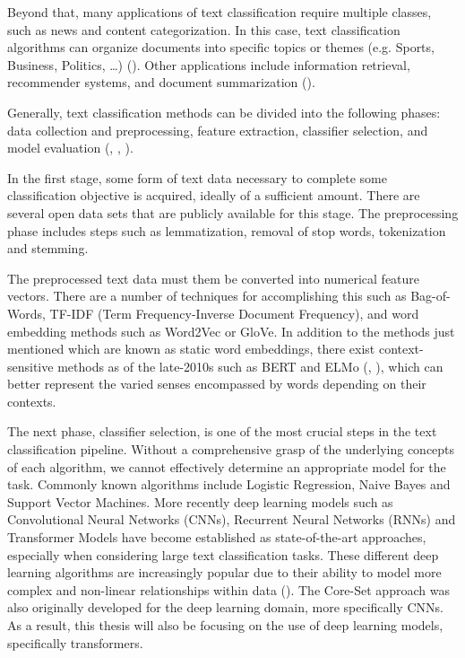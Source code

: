 \documentclass[english,bachelor,ul]{webisthesis} %
\begin{document}
Beyond that, many applications of text classification require multiple classes, such as news and content categorization. In this case, text classification algorithms can organize documents into specific topics or themes (e.g. Sports, Business, Politics, \dots) (\cite{DBLP:journals/csur/Sebastiani02}). Other applications include information retrieval, recommender systems, and document summarization (\cite{DBLP:journals/information/KowsariMHMBB19}).

Generally, text classification methods can be divided into the following phases: data collection and preprocessing, feature extraction, classifier selection, and model evaluation (\cite{DBLP:journals/information/KowsariMHMBB19}, \cite{DBLP:journals/eswa/MironczukP18}, \cite{ikonomakis2005text}).

In the first stage, some form of text data necessary to complete some classification objective is acquired, ideally of a sufficient amount. There are several open data sets that are publicly available for this stage. The preprocessing phase includes steps such as lemmatization, removal of stop words, tokenization and stemming. 

The preprocessed text data must them be converted into numerical feature vectors. There are a number of techniques for accomplishing this such as Bag-of-Words, TF-IDF (Term Frequency-Inverse Document Frequency), and word embedding methods such as Word2Vec or GloVe. In addition to the methods just mentioned which are known as static word embeddings, there exist context-sensitive methods as of the late-2010s such as BERT and ELMo (\cite{DBLP:conf/naacl/DevlinCLT19}, \cite{DBLP:conf/naacl/PetersNIGCLZ18}), which can better represent the varied senses encompassed by words depending on their contexts.

The next phase, classifier selection, is one of the most crucial steps in the text classification pipeline. Without a comprehensive grasp of the underlying concepts of each algorithm, we cannot effectively determine an appropriate model for the task. Commonly known algorithms include Logistic Regression, Naive Bayes and Support Vector Machines. More recently deep learning models such as Convolutional Neural Networks (CNNs), Recurrent Neural Networks (RNNs) and Transformer Models have become established as state-of-the-art approaches, especially when considering large text classification tasks. These different deep learning algorithms are increasingly popular due to their ability to model more complex and non-linear relationships within data (\cite{DBLP:journals/nature/LeCunBH15}). The Core-Set approach was also originally developed for the deep learning domain, more specifically CNNs. As a result, this thesis will also be focusing on the use of deep learning models, specifically transformers.
\end{document}
